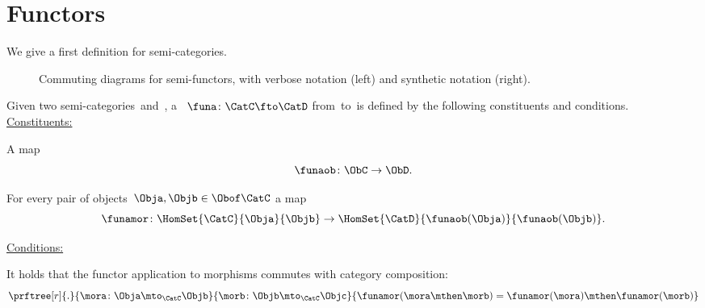 \section{Functors}

We give a first definition for semi-categories.


\begin{figure*}
    \begin{ctdefinitionshade}
    \end{ctdefinitionshade}
    \caption{Commuting diagrams for semi-functors, with verbose notation (left) and synthetic notation (right).}
\end{figure*}

\begin{ctdefinition}
    \label{def:semi-functor}
    Given two semi-categories~\CatC and~\CatD, a \emph{}~$\funa\colon \CatC\fto \CatD$ from~\CatC to~\CatD is defined by the following constituents and conditions. \\
    \underline{Constituents:}
    \begin{compactenum}
        [i)]
        \item A map
              \begin{equation}
                  \funaob\colon \ObC \to \ObD.
              \end{equation}
        \item For every pair of objects~$\Obja, \Objb\in \Obof\CatC$ a map
              \begin{equation}
                  \funamor\colon \HomSet{\CatC}{\Obja}{\Objb} \to \HomSet{\CatD}{\funaob(\Obja)}{\funaob(\Objb)}.
              \end{equation}
    \end{compactenum}
    \underline{Conditions:}
    \begin{compactenum}
        \item It holds that the functor application to morphisms commutes with category composition:
              \begin{equation}
                  \prftree[r]{.}{
                      \mora\colon \Obja \mto_{\CatC} \Objb
                  }{
                      \morb\colon \Objb \mto_{\CatC} \Objc
                  }{
                      \funamor(\mora \mthen \morb)=\funamor(\mora)\mthen \funamor(\morb)
                  }
              \end{equation}
    \end{compactenum}
\end{ctdefinition}

